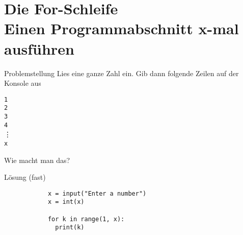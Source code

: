 \section{Die For-Schleife \\ \footnotesize Einen Programmabschnitt x-mal ausführen}

\begin{frame}

\begin{block}{Problemstellung}
\vspace{2pt}
Lies eine ganze Zahl  ein. Gib dann folgende Zeilen auf der Konsole aus 

\texttt{1}\\
\texttt{2}\\
\texttt{3}\\
\texttt{4}\\
\vdots \\
\texttt{x}

\vspace{12pt}
Wie macht man das? 

\end{block}
\end{frame}

\begin{fragile}{}
	\begin{block}{Lösung \footnotesize (fast)}
		\begin{verbatim}
			x = input("Enter a number")
			x = int(x)
			
			for k in range(1, x):	
			  print(k)
		\end{verbatim}
	\end{block}
\end{fragile}

